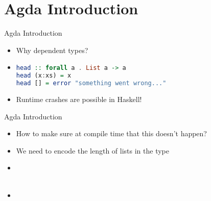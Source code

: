 \section{Agda Introduction}
\begin{frame}[fragile]{Agda Introduction}
\begin{itemize}
\item Why dependent types?
\item
\begin{lstlisting}[language=Haskell]
head :: forall a . List a -> a
head (x:xs) = x
head [] = error "something went wrong..."
\end{lstlisting}
\item Runtime crashes are possible in Haskell!
\end{itemize}
\end{frame}

\begin{frame}[fragile]{Agda Introduction}
\begin{itemize}
  \item How to make sure at compile time that this doesn't happen?
  \item We need to encode the length of lists in the type
\pause \item \begin{code}%
\>  \AgdaSymbol{:}  \<%
\\
\>[0]\<[2]%
\>[2] \AgdaSymbol{:} \<%
\\
\>[0]\<[2]%
\>[2] \AgdaSymbol{:}   \<%
\end{code}
\pause \item \begin{code}%
\>  \AgdaSymbol{:} \AgdaSymbol{(} \AgdaSymbol{:} \AgdaSymbol{)}  \AgdaSymbol{(} \AgdaSymbol{:} \AgdaSymbol{)}   \<%
\\
\>[0]\<[2]%
\>[2] \<[7]%
\>[7]\AgdaSymbol{:}  \AgdaSymbol{\{}\AgdaSymbol{\}}    \<%
\\
\>[0]\<[2]%
\>[2] \AgdaSymbol{:}  \AgdaSymbol{\{} \AgdaSymbol{\}}          \AgdaSymbol{(} \AgdaSymbol{)}\<%
\end{code}
\end{itemize}
\end{frame}

